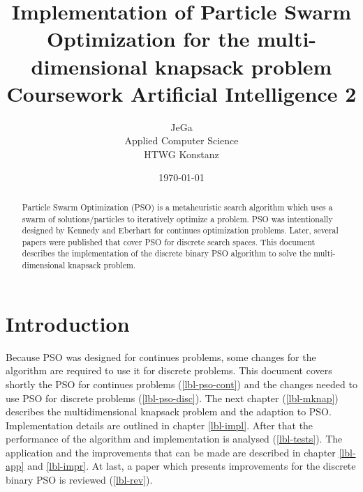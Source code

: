 \documentclass{article}
\begin{document}
\title{Implementation of Particle Swarm Optimization for the multi-dimensional knapsack problem \\
\vspace{2 mm} {\large Coursework Artificial Intelligence 2}}
\author{JeGa\\
        Applied Computer Science\\
		HTWG Konstanz}
\date{\today}
\maketitle

\begin{abstract}
Particle Swarm Optimization (PSO) is a metaheuristic search algorithm which uses a swarm of solutions/particles to iteratively optimize a problem. PSO was intentionally designed by Kennedy and Eberhart \cite{bib-continues} for continues optimization problems. Later, several papers were published that cover PSO for discrete search spaces. This document describes the implementation of the discrete binary PSO algorithm to solve the multi-dimensional knapsack problem.
\end{abstract}

\newpage

\tableofcontents

\newpage

\section{Introduction}
\label{lbl-intro}
Because PSO was designed for continues problems, some changes for the algorithm are required to use it for discrete problems. This document covers shortly the PSO for continues problems (\ref{lbl-pso-cont}) and the changes needed to use PSO for discrete problems (\ref{lbl-pso-disc}). The next chapter (\ref{lbl-mknap}) describes the multidimensional knapsack problem and the adaption to PSO.
Implementation details are outlined in chapter \ref{lbl-impl}. After that the performance of the algorithm and implementation is analysed (\ref{lbl-tests}). The application and the improvements that can be made are described in chapter \ref{lbl-app} and \ref{lbl-impr}. At last, a paper which presents improvements for the discrete binary PSO is reviewed (\ref{lbl-rev}).
\end{document}
